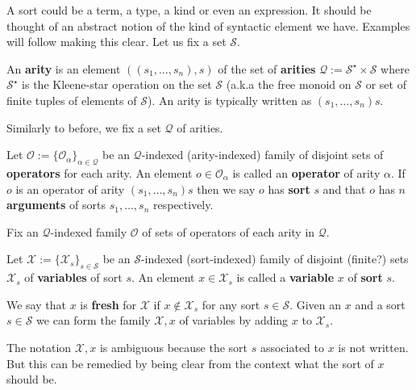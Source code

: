 A sort could be a term, a type, a kind or even an expression. It should be thought of an abstract notion of the kind of syntactic element we have. Examples will follow making this clear. Let us fix a set $\mathcal S$.

\begin{defin}[Arities]
    An \textbf{arity} is an element $((s_1,\dots,s_n),s)$ of the set of \textbf{arities} $\mathcal{Q}:=\mathcal{S}^\star \times \mathcal{S}$ where $\mathcal{S}^\star$ is the Kleene-star operation on the set $\mathcal{S}$ (a.k.a the free monoid on $\mathcal{S}$ or set of finite tuples of elements of $\mathcal{S}$). An arity is typically written as $(s_1,\dots,s_n)s$. 
\end{defin}

Similarly to before, we fix a set $\mathcal{Q}$ of arities.

\begin{defin}[Operators]
    Let $\mathcal{O} :=\{ \mathcal{O}_\alpha \}_{\alpha \in \mathcal{Q}}$ be an $\mathcal{Q}$-indexed (arity-indexed) family of disjoint sets of \textbf{operators} for each arity. An element $o \in \mathcal{O}_\alpha$ is called an \textbf{operator} of arity $\alpha$. If $o$ is an operator of arity $(s_1,\dots,s_n)s$ then we say $o$ has \textbf{sort} $s$ and that $o$ has $n$ \textbf{arguments} of sorts $s_1,\dots,s_n$ respectively.
\end{defin}

Fix an $\mathcal{Q}$-indexed family $\mathcal{O}$ of sets of operators of each arity in $\mathcal{Q}$.

\begin{defin}[Variables]
    Let $\mathcal{X}:= \{ \mathcal{X}_s\}_{s \in \mathcal{S}}$ be an $\mathcal{S}$-indexed (sort-indexed) family of disjoint (finite?) sets $\mathcal{X}_s$ of \textbf{variables} of sort $s$. An element $x\in\mathcal{X}_s$ is called a \textbf{variable} $x$ of \textbf{sort} $s$. 
\end{defin}

\begin{defin}
    We say that $x$ is \textbf{fresh} for $\mathcal{X}$ if $x \not\in \mathcal{X}_s$ for any sort $s\in \mathcal{S}$. Given an $x$ and a sort $s\in \mathcal{S}$ we can form the family $\mathcal{X},x$ of variables by adding $x$ to $\mathcal{X}_s$. 
\end{defin}

\begin{remark}
    The notation $\mathcal{X},x$ is ambiguous because the sort $s$ associated to $x$ is not written. But this can be remedied by being clear from the context what the sort of $x$ should be.
\end{remark}

